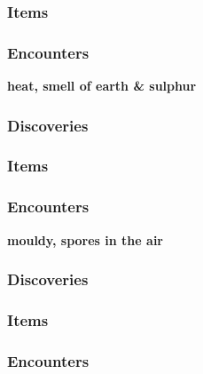 \subsubsection{Items}
\begin{itemize}
\end{itemize}
\subsubsection{Encounters}
\begin{itemize}
\end{itemize}

\textbf{heat, smell of earth \& sulphur}
\begin{DndReadAloud}
\end{DndReadAloud}
\subsubsection{Discoveries}
\begin{itemize}
\end{itemize}
\subsubsection{Items}
\begin{itemize}
\end{itemize}
\subsubsection{Encounters}
\begin{itemize}
\end{itemize}

\textbf{mouldy, spores in the air}
\begin{DndReadAloud}
\end{DndReadAloud}
\subsubsection{Discoveries}
\begin{itemize}
\end{itemize}
\subsubsection{Items}
\begin{itemize}
\end{itemize}
\subsubsection{Encounters}
\begin{itemize}
\end{itemize}

